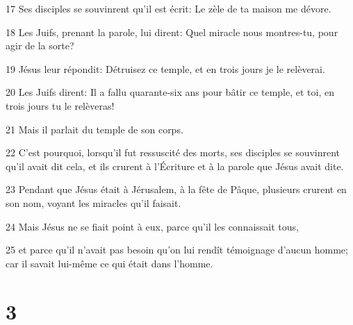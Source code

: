 \par 17 Ses disciples se souvinrent qu'il est écrit: Le zèle de ta maison me dévore.
\par 18 Les Juifs, prenant la parole, lui dirent: Quel miracle nous montres-tu, pour agir de la sorte?
\par 19 Jésus leur répondit: Détruisez ce temple, et en trois jours je le relèverai.
\par 20 Les Juifs dirent: Il a fallu quarante-six ans pour bâtir ce temple, et toi, en trois jours tu le relèveras!
\par 21 Mais il parlait du temple de son corps.
\par 22 C'est pourquoi, lorsqu'il fut ressuscité des morts, ses disciples se souvinrent qu'il avait dit cela, et ils crurent à l'Écriture et à la parole que Jésus avait dite.
\par 23 Pendant que Jésus était à Jérusalem, à la fête de Pâque, plusieurs crurent en son nom, voyant les miracles qu'il faisait.
\par 24 Mais Jésus ne se fiait point à eux, parce qu'il les connaissait tous,
\par 25 et parce qu'il n'avait pas besoin qu'on lui rendît témoignage d'aucun homme; car il savait lui-même ce qui était dans l'homme.

\chapter{3}

